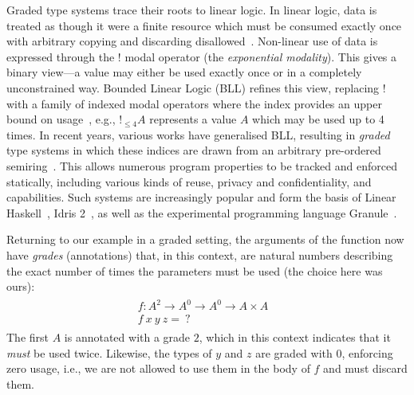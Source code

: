 Graded type systems trace their roots to linear logic. In linear logic, data is
treated as though it were a finite resource which must be consumed exactly once
with arbitrary copying and discarding disallowed~\cite{girard1987linear}.
Non-linear use of data is expressed through the $!$ modal operator (the
\emph{exponential modality}). This gives a binary view---a value may either be
used exactly once or in a completely unconstrained way. Bounded Linear Logic
(BLL) refines this view, replacing ! with a family of indexed modal operators
where the index provides an upper bound on usage~\cite{girard1992bounded}, e.g.,
$!_{\leq 4}A$ represents a value $A$ which may be used up to 4 times. In recent
years, various works have generalised BLL, resulting in \textit{graded} type
systems in which these indices are drawn from an arbitrary pre-ordered
semiring~\cite{DBLP:conf/esop/BrunelGMZ14,DBLP:conf/esop/GhicaS14,petricek2014coeffects,DBLP:journals/pacmpl/AbelB20,DBLP:journals/pacmpl/ChoudhuryEEW21,quantitative-type-theory,McBride2016}.
This allows numerous program properties to be tracked and enforced statically,
including various kinds of reuse, privacy and confidentiality, and capabilities.
Such systems are increasingly popular and form the basis of Linear
Haskell~\cite{DBLP:journals/pacmpl/BernardyBNJS18}, Idris
2~\cite{DBLP:journals/corr/abs-2104-00480}, as well as the experimental
programming language Granule~\cite{DBLP:journals/pacmpl/OrchardLE19}.

Returning to our example in a graded setting, the arguments of the function now
have \emph{grades} (annotations) that, in this context, are natural numbers
describing the exact number of times the parameters must be used (the choice
here was ours):
%
\begin{align*}
  \begin{array}{ll}
    f : A^{2} \rightarrow A^{0} \rightarrow A^{0} \rightarrow A \times A &
    \\
    f\ x\ y\ z =\ ? &
  \end{array}
\end{align*}
The first $A$ is annotated with a grade $2$, which in this context indicates that it
\textit{must} be used twice. Likewise, the types of $y$ and $z$
are graded with $0$, enforcing zero usage, i.e., we are not allowed
to use them in the body of $f$ and must discard them.

